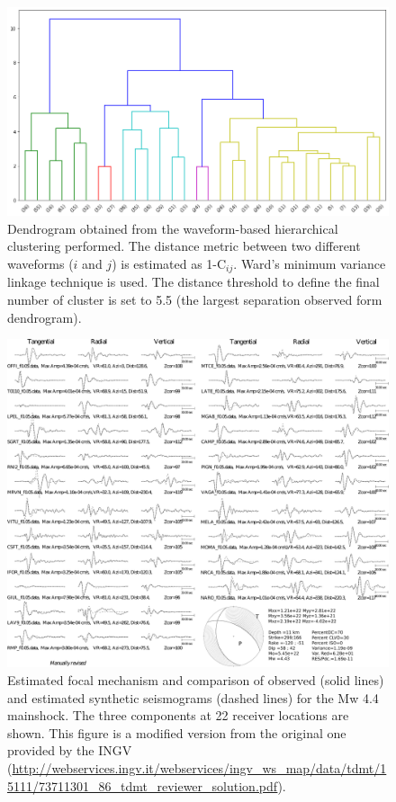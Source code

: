 \documentclass[a4paper,12pt]{article}
\begin{document}
\begin{figure}
\renewcommand{\thefigure}{S\arabic{figure}}
\begin{center}
 \noindent\includegraphics[width=1\linewidth]{dendrogram_balsorano.png} 
\end{center}
\caption{Dendrogram obtained from the waveform-based hierarchical clustering performed. The distance metric between two different waveforms ($i$ and $j$) is estimated as 1-C$_{ij}$. Ward's minimum variance linkage technique is used. The distance threshold to define the final number of cluster is set to 5.5 (the largest separation observed form dendrogram).}
\label{fig:dendrogram}
\end{figure}

\begin{figure}
\renewcommand{\thefigure}{S\arabic{figure}}
\begin{center}
 \noindent \includegraphics[width=1\linewidth]{S2_Focal_synthetics} 
\end{center}
\caption{Estimated focal mechanism and comparison of observed (solid lines) and estimated synthetic seismograms (dashed lines) for the Mw 4.4 mainshock. The three components at 22 receiver locations are shown. This figure is a modified version from the original one provided by the INGV (\url{http://webservices.ingv.it/webservices/ingv_ws_map/data/tdmt/15111/73711301_86_tdmt_reviewer_solution.pdf}).}\label{fig:S2_focal_mechanism}
\end{figure}
\end{document}
